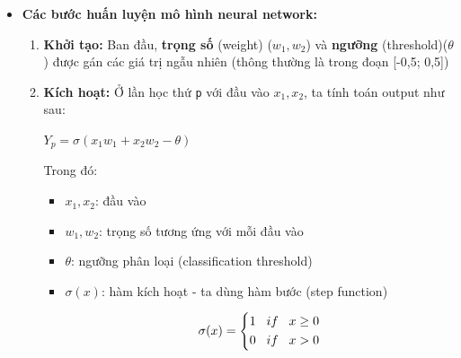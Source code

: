 \begin{itemize}
\begin{figure}[H]
    \end{figure}
    \item \textbf{Các bước huấn luyện mô hình neural network:}
    \begin{enumerate}
    \item \textbf{Khởi tạo:} Ban đầu, \textbf{trọng số} (weight) ($w_1, w_2$)  và \textbf{ngưỡng} (threshold)($\theta$) được gán các giá trị ngẫu nhiên (thông thường là trong đoạn [-0,5; 0,5])
    \item \textbf{Kích hoạt:}
    Ở lần học thứ \texttt{p} với đầu vào $x_1, x_2$, ta tính toán output như sau:
    \begin{center}
        \large $Y_{p} = \sigma(x_{1}w_{1}+x_{2}w_{2}-\theta)$
    \end{center}
        Trong đó:
        \begin{itemize}
        \item $x_{1}, x_{2}$: đầu vào
        \item $w_{1}, w_{2}$: trọng số tương ứng với mỗi đầu vào
        \item $\theta$: ngưỡng phân loại (classification threshold)
        \item $\sigma(x)$: hàm kích hoạt - ta dùng hàm bước (step function)
        \begin{center} 
        \begin{align*}
        \sigma(x)= \left\{
        \begin{aligned}
        1 \hspace{0.3cm} if \hspace{0.3cm} x \ge  0\\
        0 \hspace{0.3cm} if \hspace{0.3cm} x > 0
        \end{aligned}
        \right.
        \end{align*}
        \end{center}
        
        \end{itemize}
    

\end{enumerate}
\end{itemize}
